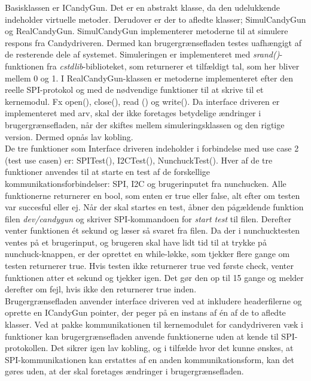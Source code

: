 Basisklassen er ICandyGun. Det er en abstrakt klasse, da den udelukkende indeholder virtuelle metoder. Derudover er der to afledte klasser; SimulCandyGun og RealCandyGun. SimulCandyGun implementerer metoderne til at simulere respons fra Candydriveren. Dermed kan brugergrænsefladen testes uafhængigt af de resterende dele af systemet. Simuleringen er implementeret med \textit{srand()}-funktionen fra \textit{cstdlib}-biblioteket, som returnerer et tilfældigt tal, som her bliver mellem 0 og 1. I RealCandyGun-klassen er metoderne implementeret efter den reelle SPI-protokol og med de nødvendige funktioner til at skrive til et kernemodul. Fx open(), close(), read () og write(). Da interface driveren er implementeret med arv, skal der ikke foretages betydelige ændringer i brugergrænsefladen, når der skiftes mellem simuleringsklassen og den rigtige version. Dermed opnås lav kobling. \\
De tre funktioner som Interface driveren indeholder i forbindelse med use case 2 (test use casen) er: SPITest(), I2CTest(), NunchuckTest(). Hver af de tre funktioner anvendes til at starte en test af de forskellige kommunikationsforbindelser: SPI, I2C og brugerinputet fra nunchucken. Alle funktionerne returnerer en bool, som enten er true eller false, alt efter om testen var succesful eller ej. Når der skal startes en test, åbner den pågældende funktion filen \textit{dev/candygun} og skriver SPI-kommandoen for \textit{start test} til filen. Derefter venter funktionen ét sekund og læser så svaret fra filen. Da der i nunchucktesten ventes på et brugerinput, og brugeren skal have lidt tid til at trykke på nunchuck-knappen, er der oprettet en while-løkke, som tjekker flere gange om testen returnerer true. Hvis testen ikke returnerer true ved første check, venter funktionen atter et sekund og tjekker igen. Det gør den op til 15 gange og melder derefter om fejl, hvis ikke den returnerer true inden.\\
Brugergrænsefladen anvender interface driveren ved at inkludere headerfilerne og oprette en ICandyGun pointer, der peger på en instans af én af de to afledte klasser. Ved at pakke kommunikationen  til kernemodulet for candydriveren væk i funktioner kan brugergrænsefladen anvende funktionerne uden at kende til SPI-protokollen. Det sikrer igen lav kobling, og i tilfælde hvor det kunne ønskes, at SPI-kommunikationen kan erstattes af en anden kommunikationsform, kan det gøres uden, at der skal foretages ændringer i brugergrænsefladen.\\
 
